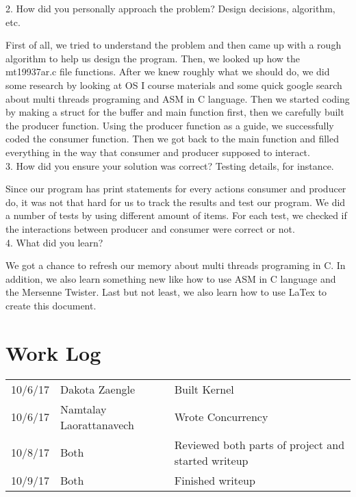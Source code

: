 \documentclass[letterpaper,10pt]{article}
\begin{document}
2.	How did you personally approach the problem? Design decisions, algorithm, etc.

First of all, we tried to understand the problem and then came up with a rough algorithm to help us design the program. Then, we looked up how the mt19937ar.c file functions. After we knew roughly what we should do, we did some research by looking at OS I course materials and some quick google search about multi threads programing and ASM in C language.  Then we started coding by making a struct for the buffer and main function first, then we carefully built the producer function. Using the producer function as a guide, we successfully coded the consumer function. Then we got back to the main function and filled everything in the way that consumer and producer supposed to interact.\\

3.	How did you ensure your solution was correct? Testing details, for instance.

Since our program has print statements for every actions consumer and producer do, it was not that hard for us to track the results and test our program. We did a number of tests by using different amount of items. For each test, we checked if the interactions between producer and consumer were correct or not.\\

4.	What did you learn?

We got a chance to refresh our memory about multi threads programing in C. In addition, we also learn something new like how to use ASM in C language and the Mersenne Twister. Last but not least, we also learn how to use LaTex to create this document.\\

\newpage

\section*{Work Log}
\begin{tabular}{l|l|l}
10/6/17 & Dakota Zaengle & Built Kernel \\
10/6/17 & Namtalay Laorattanavech & Wrote Concurrency \\
10/8/17 & Both & Reviewed both parts of project and started writeup \\
10/9/17 & Both & Finished writeup \\
\end{tabular}
\end{document}
